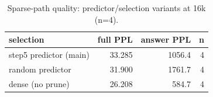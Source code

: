 \begin{table}[t]
\centering
\caption{Sparse-path quality: predictor/selection variants at 16k (n=4).}
\label{tab:opt-quality}
\begin{tabular}{lrrr}
\toprule
selection & full PPL & answer PPL & n \\
\midrule
step5 predictor (main) & 33.285 & 1056.4 & 4 \\
random predictor & 31.900 & 1761.7 & 4 \\
dense (no prune) & 26.208 & 584.7 & 4 \\
\bottomrule
\end{tabular}
\end{table}

